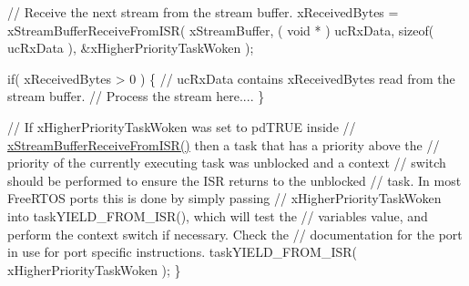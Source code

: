\begin{DoxyPre} // Receive the next stream from the stream buffer.
 xReceivedBytes = xStreamBufferReceiveFromISR( xStreamBuffer,
                                               ( void * ) ucRxData,
                                               sizeof( ucRxData ),
                                               \&xHigherPriorityTaskWoken );\end{DoxyPre}



\begin{DoxyPre} if( xReceivedBytes > 0 )
 \{
     // ucRxData contains xReceivedBytes read from the stream buffer.
     // Process the stream here....
 \}\end{DoxyPre}



\begin{DoxyPre} // If xHigherPriorityTaskWoken was set to pdTRUE inside
 // \hyperlink{stream__buffer_8h_a6c882a1d9f26c40f93f271bd1b844b3b}{xStreamBufferReceiveFromISR()} then a task that has a priority above the
 // priority of the currently executing task was unblocked and a context
 // switch should be performed to ensure the ISR returns to the unblocked
 // task.  In most FreeRTOS ports this is done by simply passing
 // xHigherPriorityTaskWoken into taskYIELD\_FROM\_ISR(), which will test the
 // variables value, and perform the context switch if necessary.  Check the
 // documentation for the port in use for port specific instructions.
 taskYIELD\_FROM\_ISR( xHigherPriorityTaskWoken );
\}
\end{DoxyPre}
 